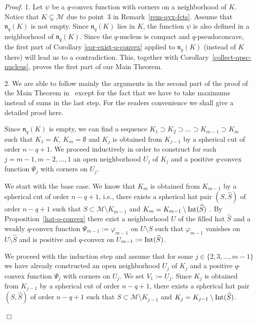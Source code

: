 \documentclass[11pt,a4paper]{article}
\newenvironment{proof}{\noindent\textit{Proof. }}{\hfill $\Box$\linebreak}
\newcommand{\Mcal}{\mathcal{M}}
\newcommand{\nuc}{\mathfrak{n}}
\newcommand{\Int}{\hbox{Int}}
\begin{document}
\begin{proof} 1. Let $\psi$ be a $q$-convex function with corners on a neighborhood of $K$. Notice that $K \subsetneq \Mcal$ due to point~3 in Remark~\ref{rem-qvx-fcts}. Assume that $\nuc_q(K)$ is not empty. Since $\nuc_q(K)$ lies in $K$, the function $\psi$ is also defined in a neighborhood of $\nuc_q(K)$. 
Since the $q$-nucleus is compact and $q$-pseudoconcave, the first part of Corollary \ref{cor-exist-q-convex} applied to $\nuc_q(K)$ (instead of $K$ there) will lead us to a contradiction. This, together with Corollary~\ref{collect-qpsc-nucleus}, proves the first part of our Main Theorem.

\medskip

2. We are able to follow mainly the arguments in the second part of the proof of the Main Theorem in~\cite{Shc21} except for the fact that we have to take maximums instead of sums in the last step. For the readers convenience we shall give a detailed proof here.

Since $\nuc_q(K)$ is empty, we can find a sequence $K_1 \supset K_2 \supset \ldots \supset K_{m-1} \supset K_m$ such that $K_1=K$, $K_m=\emptyset$ and $K_{j} $ is obtained from $K_{j-1}$ by a spherical cut of order $n{-}q{+}1$. We proceed inductively in order to construct for each $j=m-1, m-2,\ldots,1$ an open neighborhood $U_{j}$ of $K_j$ and a positive $q$-convex function $\Psi_j$ with corners  on $U_j$.

We start with the base case. We know that $K_{m}$ is obtained from $K_{m-1}$ by a spherical cut of order $n-q+1$, i.e., there exists a spherical hat pair $(S,\widehat{S})$ of order $n-q+1$ such that $S \subset \Mcal \setminus K_{m-1}$ and $K_{m} = K_{m-1}\setminus \Int(\widehat{S})$ . By Proposition~\ref{hat-q-convex} there exist a neighborhood $U$ of the filled hat $\widehat{S}$ and a weakly $q$-convex function $\Psi_{m-1}:=\varphi_{m-1}$ on $U\setminus S$ such that $\varphi_{m-1}$ vanishes on $U\setminus \widehat{S}$ and is positive and $q$-convex on $U_{m-1}:=\Int(\widehat{S})$. 

We proceed with the induction step and assume that for some $j \in \{2, 3 , \ldots , m - 1\}$ we have already constructed an open neighborhood $U_j$ of $K_j$ and a positive $q$-convex function $\Psi_j$ with corners on $U_j$. We set $V_1:=U_j$. Since $K_j$ is obtained from $K_{j-1}$ by a spherical cut of order $n-q+1$, there exists a spherical hat pair $(S,\widehat{S})$ of order $n-q+1$ such that $S \subset \Mcal \setminus K_{j-1}$ and $K_{j} = K_{j-1}\setminus \Int(\widehat{S})$. 


\end{proof}
\end{document}
